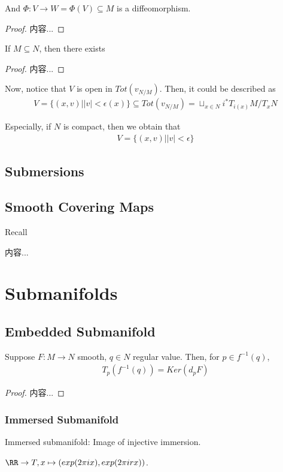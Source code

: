 \documentclass[Total.tex]{subfiles}
\begin{document}
				And $\Phi:V\rightarrow W=\Phi(V)\subseteq M$ is a diffeomorphism. 
				
				\begin{proof}
					内容...
				\end{proof}
				
				\begin{corollary}
					If $M\subseteq N$, then there exists 
				\end{corollary}
				\begin{proof}
					内容...
				\end{proof}
				
				Now, notice that $V$ is open in $Tot(v_{N/M})$. Then, it could be described as
				\begin{gather*}
					V=\{(x,v)||v|<\epsilon(x)\}\subseteq Tot(v_{N/M})=\sqcup_{x\in N} i^* T_{i(x )} M/T_xN
				\end{gather*}
				
				Especially, if $N$ is compact, then we obtain that
				\begin{gather*}
					V=\{(x,v)||v|<\epsilon\}
				\end{gather*}
		\section{Submersions}
		
		\section{Smooth Covering Maps}
			Recall
			\begin{Def}
				内容...
			\end{Def}
	\chapter{Submanifolds}
		\section{Embedded Submanifold}
			\begin{proposition}
				Suppose $F:M\rightarrow N$ smooth, $q\in N$ regular value. Then, for $p\in f^{-1}(q)$,
				\begin{gather*}
					T_p(f^{-1}(q))=Ker(d_p F)
				\end{gather*}
			\end{proposition}
			\begin{proof}
				内容...
			\end{proof}
		\subsection{Immersed Submanifold}
			\begin{Def}
				Immersed submanifold: Image of injective immersion.
			\end{Def}
			\begin{example}
				$\RR\rightarrow T,x\mapsto (exp(2\pi ix),exp(2\pi i r x))$. 
			\end{example}
			
\end{document}

